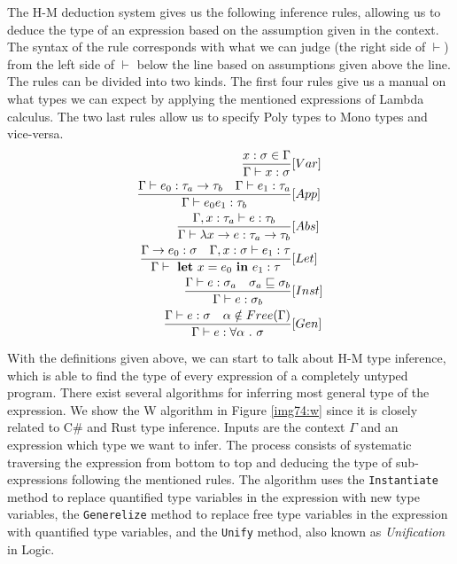 The H-M deduction system gives us the following inference rules, allowing us to deduce the type of an expression based on the assumption given in the context. 
The syntax of the rule corresponds with what we can judge (the right side of $\vdash$) from the left side of $\vdash$ below the line based on assumptions given above the line.
The rules can be divided into two kinds.
The first four rules give us a manual on what types we can expect by applying the mentioned expressions of Lambda calculus. 
The two last rules allow us to specify Poly types to Mono types and vice-versa.
\begin{align*}
\frac{x : \sigma \in \Gamma}{\Gamma \vdash x : \sigma}&[Var]\\
\frac{\Gamma \vdash e_0 : \tau_a \rightarrow \tau_b\ \ \ \Gamma \vdash e_1 : \tau_a}{\Gamma \vdash e_0 e_1 : \tau_b}&[App]\\
\frac{\Gamma, x : \tau_a \vdash e : \tau_b}{\Gamma \vdash \lambda x \rightarrow e : \tau_a \rightarrow \tau_b}&[Abs]\\
\frac{\Gamma \rightarrow e_0 : \sigma \ \ \ \Gamma , x : \sigma \vdash e_1 : \tau}{\Gamma \vdash\ \text{\textbf{let}}\ x = e_0\ \text{\textbf{in}}\ e_1 : \tau}&[Let]\\
\frac{\Gamma \vdash e : \sigma_a \ \ \ \sigma_a \sqsubseteq \sigma_b}{\Gamma \vdash e : \sigma_b}&[Inst]\\
\frac{\Gamma \vdash e : \sigma \ \ \ \alpha \notin Free(\Gamma)}{\Gamma \vdash e : \forall \alpha\ .\ \sigma}&[Gen]\\
\end{align*}
\par
{}
With the definitions given above, we can start to talk about H-M type inference, which is able to find the type of every expression of a completely untyped program.
There exist several algorithms for inferring most general type of the expression.
We show the W algorithm in Figure \ref{img74:w} since it is closely related to C\# and Rust type inference.
Inputs are the context $\Gamma$ and an expression which type we want to infer.
The process consists of systematic traversing the expression from bottom to top and deducing the type of sub-expressions following the mentioned rules.
The algorithm uses the \texttt{Instantiate} method to replace quantified type variables in the expression with new type variables, the \texttt{Generelize} method to replace free type variables in the expression with quantified type variables, and the \texttt{Unify} method, also known as \textit{Unification} in Logic.
